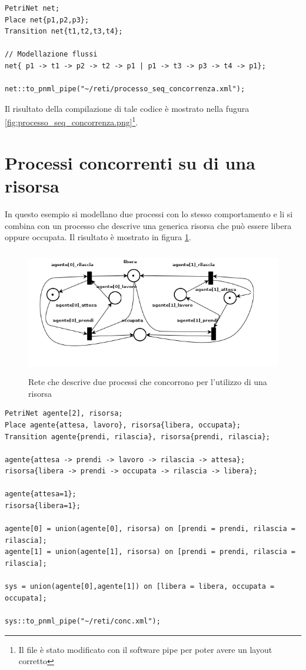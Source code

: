 \documentclass[italian,12pt]{book}
\begin{document}
\begin{verbatim}PetriNet net;
Place net{p1,p2,p3};
Transition net{t1,t2,t3,t4};

// Modellazione flussi
net{ p1 -> t1 -> p2 -> t2 -> p1 | p1 -> t3 -> p3 -> t4 -> p1};

net::to_pnml_pipe("~/reti/processo_seq_concorrenza.xml");
\end{verbatim}

Il risultato della compilazione di tale codice è mostrato nella fugura \ref{fig:processo_seq_concorrenza.png}\footnote{Il file è stato modificato con il software pipe per poter avere un layout corretto}.

\section{Processi concorrenti su di una risorsa}
In questo esempio si modellano due processi con lo stesso comportamento e li si combina con un processo che descrive una generica risorsa che può essere libera oppure occupata. Il risultato è mostrato in figura \ref{fig:processi_concorrenti_su_risorsa.png}.
\begin{figure}[htb]
\centerline{\includegraphics[height=5.5cm]{img/processi_concorrenti_su_risorsa.png}}
\caption{Rete che descrive due processi che concorrono per l'utilizzo di una risorsa}\label{fig:processi_concorrenti_su_risorsa.png}
\end{figure}

\begin{verbatim}PetriNet agente[2], risorsa;
Place agente{attesa, lavoro}, risorsa{libera, occupata};
Transition agente{prendi, rilascia}, risorsa{prendi, rilascia};

agente{attesa -> prendi -> lavoro -> rilascia -> attesa};
risorsa{libera -> prendi -> occupata -> rilascia -> libera};

agente{attesa=1};
risorsa{libera=1};

agente[0] = union(agente[0], risorsa) on [prendi = prendi, rilascia = rilascia];
agente[1] = union(agente[1], risorsa) on [prendi = prendi, rilascia = rilascia];

sys = union(agente[0],agente[1]) on [libera = libera, occupata = occupata];

sys::to_pnml_pipe("~/reti/conc.xml");
\end{verbatim}
\end{document}
